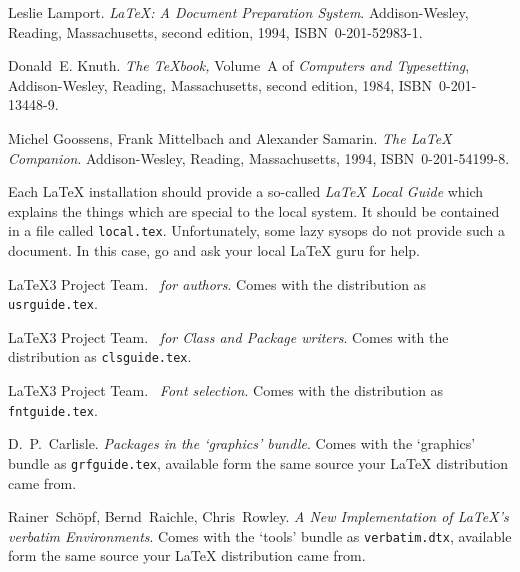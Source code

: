 \begin{thebibliography}{99}
 Leslie Lamport.  \newblock \emph{{\LaTeX:} A Document
    Preparation System}.  \newblock Addison-Wesley, Reading,
  Massachusetts, second edition, 1994, ISBN~0-201-52983-1.
  
 Donald~E. Knuth.  \newblock \textit{The \TeX{}book,}
  Volume~A of \textit{Computers and Typesetting}, Addison-Wesley,
  Reading, Massachusetts, second edition, 1984, ISBN~0-201-13448-9.

 Michel Goossens, Frank Mittelbach and Alexander
  Samarin.  \newblock \emph{The {\LaTeX} Companion}.  \newblock
  Addison-Wesley, Reading, Massachusetts, 1994, ISBN~0-201-54199-8.
 
 Each \LaTeX{} installation should provide a so-called
  \emph{\LaTeX{} Local Guide} which explains the things which are
  special to the local system.  It should be contained in a file called
  \texttt{local.tex}. Unfortunately, some lazy sysops do not provide such a
  document. In this case, go and ask your local \LaTeX{} guru for help.
 
 \LaTeX3 Project Team.  \newblock \emph{\LaTeXe~for
    authors}.  \newblock Comes with the \LaTeXe{} distribution as
  \texttt{usrguide.tex}.

 \LaTeX3 Project Team.  \newblock \emph{\LaTeXe~for
    Class and Package writers}.  \newblock Comes with the \LaTeXe{}
  distribution as \texttt{clsguide.tex}.

 \LaTeX3 Project Team.  \newblock \emph{\LaTeXe~Font
    selection}.  \newblock Comes with the \LaTeXe{} distribution as
  \texttt{fntguide.tex}.

 D.~P.~Carlisle.  \newblock \emph{Packages in the
    `graphics' bundle}.  \newblock Comes with the `graphics' bundle as
  \texttt{grfguide.tex}, available form the same source your \LaTeX{}
  distribution came from.

 Rainer~Sch\"opf, Bernd~Raichle, Chris~Rowley.  
\newblock \emph{A New Implementation of \LaTeX's verbatim
  Environments}.
 \newblock Comes with the `tools' bundle as
  \texttt{verbatim.dtx}, available form the same source your \LaTeX{}
  distribution came from. 


\end{thebibliography}
